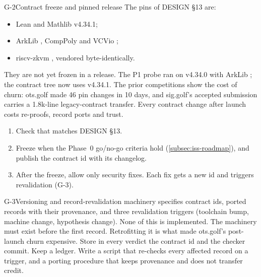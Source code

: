 \begin{issue}{G-2}{Contract freeze and pinned release}
\IRprob The pins of DESIGN §13 are:
\begin{itemize}[nosep]
\item Lean and Mathlib v4.34.1;
\item ArkLib , CompPoly  and VCVio ;
\item riscv-zkvm , vendored byte-identically.
\end{itemize}
They are not yet frozen in a release. The P1 probe ran on v4.34.0 with ArkLib ; the
contract tree now uses v4.34.1. The prior competitions show the cost of churn: ots.golf made 46 pin
changes in 10 days, and sig.golf's accepted submission carries a 1.8k-line legacy-contract transfer.
\IRwhy Every contract change after launch costs re-proofs, record ports and trust.
\IRres
\begin{enumerate}[nosep,leftmargin=1.4em]
\item Check that  matches DESIGN §13.
\item Freeze when the Phase~0 go/no-go criteria hold (\cref{subsec:iss-roadmap}), and publish the
  contract id with its changelog.
\item After the freeze, allow only security fixes. Each fix gets a new id and triggers revalidation
  (G-3).
\end{enumerate}
\end{issue}

\begin{issue}{G-3}{Versioning and record-revalidation machinery}
\IRprob {} specifies contract ids, ported records with their provenance,
and three revalidation triggers (toolchain bump, machine change, hypothesis change). None of this
is implemented.
\IRwhy The machinery must exist before the first record. Retrofitting it is what made ots.golf's
post-launch churn expensive.
\IRres Store in every verdict the contract id and the checker commit. Keep a
 ledger. Write a script that re-checks every affected record on a
trigger, and a porting procedure that keeps provenance and does not transfer credit.
\end{issue}

